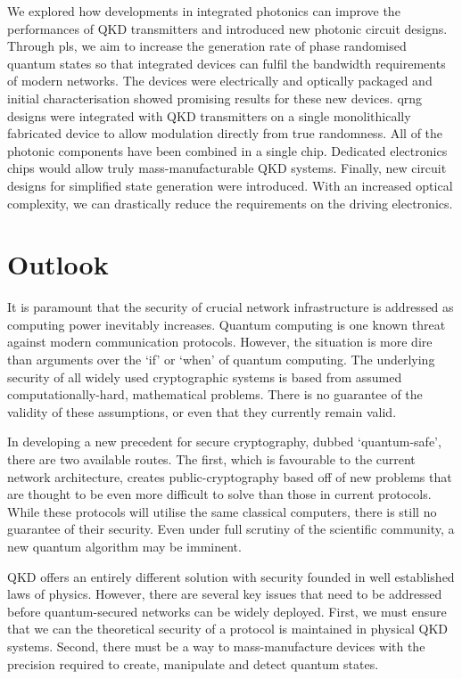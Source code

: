 We explored how developments in integrated photonics can improve the performances of \ac{QKD} transmitters and introduced new photonic circuit designs. Through \ac{pls}, we aim to increase the generation rate of phase randomised quantum states so that integrated devices can fulfil the bandwidth requirements of modern networks. The devices were electrically and optically packaged and initial characterisation showed promising results for these new devices. \Ac{qrng} designs were integrated with \ac{QKD} transmitters on a single monolithically fabricated device to allow modulation directly from true randomness. All of the photonic components have been combined in a single chip. Dedicated electronics chips would allow truly mass-manufacturable \ac{QKD} systems. Finally, new circuit designs for simplified state generation were introduced. With an increased optical complexity, we can drastically reduce the requirements on the driving electronics.

\clearpage
\newpage
\section{Outlook}

It is paramount that the security of crucial network infrastructure is addressed as computing power inevitably increases. Quantum computing is one known threat against modern communication protocols. However, the situation is more dire than arguments over the `if' or `when' of quantum computing. The underlying security of all widely used cryptographic systems is based from assumed computationally-hard, mathematical problems. There is no guarantee of the validity of these assumptions, or even that they currently remain valid.

In developing a new precedent for secure cryptography, dubbed `quantum-safe', there are two available routes. The first, which is favourable to the current network architecture, creates public-cryptography based off of new problems that are thought to be even more difficult to solve than those in current protocols. While these protocols will utilise the same classical computers, there is still no guarantee of their security. Even under full scrutiny of the scientific community, a new quantum algorithm may be imminent. 

\Ac{QKD} offers an entirely different solution with security founded in well established laws of physics. However, there are several key issues that need to be addressed before quantum-secured networks can be widely deployed. First, we must ensure that we can the theoretical security of a protocol is maintained in physical \ac{QKD} systems. Second, there must be a way to mass-manufacture devices with the precision required to create, manipulate and detect quantum states. 

